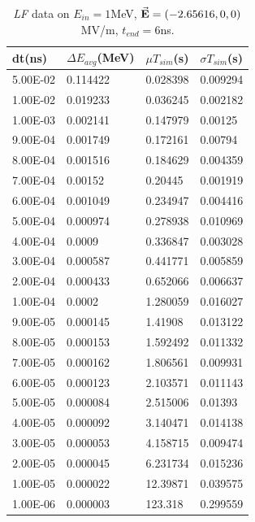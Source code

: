 \documentclass[a4paper,oneside,12pt]{report}
\numberwithin{equation}{chapter}
\begin{document}
{\begin{table}[H]
    \centering
    \caption{\textit{LF} data on $E_{in}=1$MeV, $\vec{\textbf{E}}=(-2.65616, 0, 0)$ MV/m, $t_{end}=6$ns.}
    \vspace{10pt}
    \begin{tabular}{|l|l|l|l|}
    \hline
    dt(ns)       & $\Delta E_{avg}$(MeV) & $\mu T_{sim}$(s)    & $\sigma T_{sim}$(s) \\\hline
    5.00E-02 & 0.114422     & 0.028398 & 0.009294 \\\hline
    1.00E-02 & 0.019233     & 0.036245 & 0.002182 \\\hline
    1.00E-03 & 0.002141     & 0.147979 & 0.00125  \\\hline
    9.00E-04 & 0.001749     & 0.172161 & 0.00794  \\\hline
    8.00E-04 & 0.001516     & 0.184629 & 0.004359 \\\hline
    7.00E-04 & 0.00152      & 0.20445  & 0.001919 \\\hline
    6.00E-04 & 0.001049     & 0.234947 & 0.004416 \\\hline
    5.00E-04 & 0.000974     & 0.278938 & 0.010969 \\\hline
    4.00E-04 & 0.0009       & 0.336847 & 0.003028 \\\hline
    3.00E-04 & 0.000587     & 0.441771 & 0.005859 \\\hline
    2.00E-04 & 0.000433     & 0.652066 & 0.006637 \\\hline
    1.00E-04 & 0.0002       & 1.280059 & 0.016027 \\\hline
    9.00E-05 & 0.000145     & 1.41908  & 0.013122 \\\hline
    8.00E-05 & 0.000153     & 1.592492 & 0.011332 \\\hline
    7.00E-05 & 0.000162     & 1.806561 & 0.009931 \\\hline
    6.00E-05 & 0.000123     & 2.103571 & 0.011143 \\\hline
    5.00E-05 & 0.000084     & 2.515006 & 0.01393  \\\hline
    4.00E-05 & 0.000092     & 3.140471 & 0.014138 \\\hline
    3.00E-05 & 0.000053     & 4.158715 & 0.009474 \\\hline
    2.00E-05 & 0.000045     & 6.231734 & 0.015236 \\\hline
    1.00E-05 & 0.000022     & 12.39871 & 0.039575 \\\hline
    1.00E-06 & 0.000003     & 123.318  & 0.299559 \\\hline
    \end{tabular}
    \label{tab:lf_statE_table}
\end{table}

}
\end{document}
